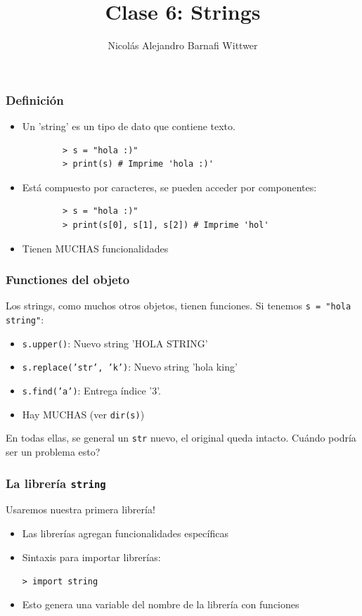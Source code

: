 \documentclass[14pt,aspectratio=169,xcolor=dvipsnames]{beamer}
\title[short title]{Clase 6: Strings}
\subtitle{}
\author[NA Barnafi] {Nicolás Alejandro Barnafi Wittwer}
\institute[UC|CMM] 
{
    Pontificia Universidad Católica de Chile \\
    Centro de Modelamiento Matemático
}
\begin{document}
\begin{frame}
    \maketitle
\end{frame}
\begin{frame}[t,fragile]\frametitle{Definición}
    \begin{itemize} 
        \item<1-> Un 'string' es un tipo de dato que contiene texto. 
            \begin{verbatim}
        > s = "hola :)"
        > print(s) # Imprime 'hola :)'
            \end{verbatim}
        \item<2-> Está compuesto por caracteres, se pueden acceder por componentes: 
            \begin{verbatim}
        > s = "hola :)"
        > print(s[0], s[1], s[2]) # Imprime 'hol'
            \end{verbatim}
        \item<3-> Tienen MUCHAS funcionalidades
    \end{itemize}
\end{frame}
\begin{frame}\frametitle{Functiones del objeto}
    Los strings, como muchos otros objetos, tienen funciones. Si tenemos \texttt{s = "hola string"}:
    \begin{itemize}
        \item \texttt{s.upper()}: Nuevo string 'HOLA STRING'
        \item \texttt{s.replace('str', 'k')}: Nuevo string 'hola king'
        \item \texttt{s.find('a')}: Entrega índice '3'.
        \item Hay MUCHAS (ver \texttt{dir(s)})
    \end{itemize}

En todas ellas, se general un \texttt{str} nuevo, el original queda intacto. Cuándo podría ser un problema esto? 
\end{frame}
\begin{frame}\frametitle{La librería \texttt{string}}
    Usaremos nuestra primera librería!
    \begin{itemize}
        \item Las librerías agregan funcionalidades específicas
        \item Sintaxis para importar librerías: 
            \begin{flushright} \texttt{> import string} \end{flushright}
        \item Esto genera una variable del nombre de la librería con funciones
    \end{itemize}

\vspace{1cm}
\pause{}
\end{frame}
\end{document}
